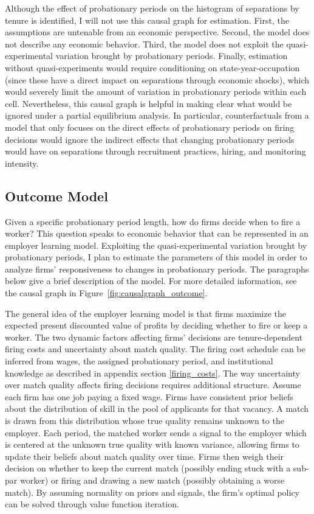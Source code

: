 \documentclass[12pt]{article}
\begin{document}
Although the effect of probationary periods on the histogram of separations by tenure is identified, I will not use this causal graph for estimation.
First, the assumptions are untenable from an economic perspective.
Second, the model does not describe any economic behavior.
Third, the model does not exploit the quasi-experimental variation brought by probationary periods.
Finally, estimation without quasi-experiments would require conditioning on state-year-occupation (since these have a direct impact on separations through economic shocks), which would severely limit the amount of variation in probationary periods within each cell.
Nevertheless, this causal graph is helpful in making clear what would be ignored under a partial equilibrium analysis.
In particular, counterfactuals from a model that only focuses on the direct effects of probationary periods on firing decisions would ignore the indirect effects that changing probationary periods would have on separations through recruitment practices, hiring, and monitoring intensity.

\subsection{Outcome Model}

Given a specific probationary period length, how do firms decide when to fire a worker?
This question speaks to economic behavior that can be represented in an employer learning model.
Exploiting the quasi-experimental variation brought by probationary periods, I plan to estimate the parameters of this model in order to analyze firms' responsiveness to changes in probationary periods.
The paragraphs below give a brief description of the model.
For more detailed information, see the causal graph in Figure~\ref{fig:causalgraph_outcome}.

The general idea of the employer learning model is that firms maximize the expected present discounted value of profits by deciding whether to fire or keep a worker. 
The two dynamic factors affecting firms' decisions are tenure-dependent firing costs and uncertainty about match quality.
The firing cost schedule can be inferred from wages, the assigned probationary period, and institutional knowledge as described in appendix section \ref{firing_costs}.
The way uncertainty over match quality affects firing decisions requires additional structure.
Assume each firm has one job paying a fixed wage.
Firms have consistent prior beliefs about the distribution of skill in the pool of applicants for that vacancy.
A match is drawn from this distribution whose true quality remains unknown to the employer.
Each period, the matched worker sends a signal to the employer which is centered at the unknown true quality with known variance, allowing firms to update their beliefs about match quality over time.
Firms then weigh their decision on whether to keep the current match (possibly ending stuck with a sub-par worker) or firing and drawing a new match (possibly obtaining a worse match).
By assuming normality on priors and signals, the firm's optimal policy can be solved through value function iteration.
\end{document}
